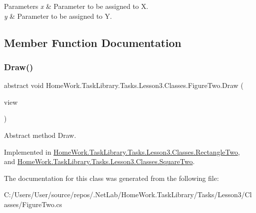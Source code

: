 \begin{DoxyParams}{Parameters}
{\em x} & Parameter to be assigned to X.\\
\hline
{\em y} & Parameter to be assigned to Y.\\
\hline
\end{DoxyParams}


\subsection{Member Function Documentation}
\mbox{\label{class_home_work_1_1_task_library_1_1_tasks_1_1_lesson3_1_1_classes_1_1_figure_two_a9588ffcda1d6b5778e4670bb48c7060b}} 
\subsubsection{\texorpdfstring{Draw()}{Draw()}}
{\footnotesize\ttfamily abstract void Home\+Work.\+Task\+Library.\+Tasks.\+Lesson3.\+Classes.\+Figure\+Two.\+Draw (\begin{DoxyParamCaption}\item[{I\+Information}]{view }\end{DoxyParamCaption})\hspace{0.3cm}{\ttfamily [pure virtual]}}



Abstract method Draw. 



Implemented in \mbox{\hyperlink{class_home_work_1_1_task_library_1_1_tasks_1_1_lesson3_1_1_classes_1_1_rectangle_two_ae3df70f68e23fa29ad3d98abedab6a0d}{Home\+Work.\+Task\+Library.\+Tasks.\+Lesson3.\+Classes.\+Rectangle\+Two}}, and \mbox{\hyperlink{class_home_work_1_1_task_library_1_1_tasks_1_1_lesson3_1_1_classes_1_1_square_two_a7ec443c0729d0e88476f703b7562b0e2}{Home\+Work.\+Task\+Library.\+Tasks.\+Lesson3.\+Classes.\+Square\+Two}}.



The documentation for this class was generated from the following file\+:\begin{DoxyCompactItemize}
\item 
C\+:/\+Users/\+User/source/repos/.\+Net\+Lab/\+Home\+Work.\+Task\+Library/\+Tasks/\+Lesson3/\+Classes/Figure\+Two.\+cs\end{DoxyCompactItemize}
